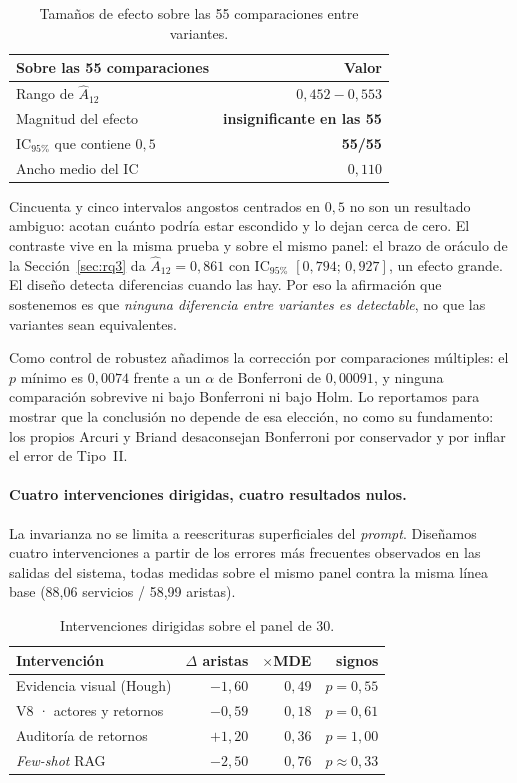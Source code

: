 \documentclass[a4paper, twocolumn, 10pt]{IEEEtran}
\begin{document}
\begin{table}[H]
\centering\small
\caption{Tamaños de efecto sobre las 55 comparaciones entre variantes.}
\label{tab:a12}
\begin{tabular}{lr}
\toprule
Sobre las 55 comparaciones & Valor\\
\midrule
Rango de $\hat{A}_{12}$            & $0{,}452 - 0{,}553$\\
Magnitud del efecto                & \textbf{insignificante en las 55}\\
IC$_{95\%}$ que contiene $0{,}5$   & \textbf{55/55}\\
Ancho medio del IC                 & $0{,}110$\\
\bottomrule
\end{tabular}
\end{table}

Cincuenta y cinco intervalos angostos centrados en $0{,}5$ no son un resultado ambiguo: acotan cuánto podría estar escondido y lo dejan cerca de cero. El contraste vive en la misma prueba y sobre el mismo panel: el brazo de oráculo de la Sección~\ref{sec:rq3} da
$\hat{A}_{12}=0{,}861$ con IC$_{95\%}$ $[0{,}794;\,0{,}927]$, un efecto grande. El diseño detecta diferencias cuando las hay. Por eso la afirmación que sostenemos es que \emph{ninguna diferencia entre variantes es detectable}, no que las variantes sean equivalentes.

Como control de robustez añadimos la corrección por comparaciones
múltiples: el $p$ mínimo es $0{,}0074$ frente a un $\alpha$ de Bonferroni de $0{,}00091$, y ninguna comparación sobrevive ni bajo Bonferroni ni bajo Holm. Lo reportamos para mostrar que la conclusión no depende de esa elección, no como su fundamento: los propios Arcuri y Briand desaconsejan Bonferroni por conservador y por inflar el error de Tipo~II.

\paragraph{Cuatro intervenciones dirigidas, cuatro resultados nulos.}
La invarianza no se limita a reescrituras superficiales del
\emph{prompt}. Diseñamos cuatro intervenciones a partir de los errores
más frecuentes observados en las salidas del sistema, todas medidas
sobre el mismo panel contra la misma línea base (88,06 servicios /
58,99 aristas).

\begin{table}[H]
\centering\small
\caption{Intervenciones dirigidas sobre el panel de 30.}
\label{tab:intervenciones}
\begin{tabular}{lrrr}
\toprule
Intervención & $\Delta$ aristas & $\times$MDE & signos\\
\midrule
Evidencia visual (Hough)   & $-1{,}60$ & $0{,}49$ & $p=0{,}55$\\
V8 · actores y retornos    & $-0{,}59$ & $0{,}18$ & $p=0{,}61$\\
Auditoría de retornos      & $+1{,}20$ & $0{,}36$ & $p=1{,}00$\\
\emph{Few-shot} RAG        & $-2{,}50$ & $0{,}76$ & $p\approx0{,}33$\\
\bottomrule
\end{tabular}
\end{table}
\end{document}
